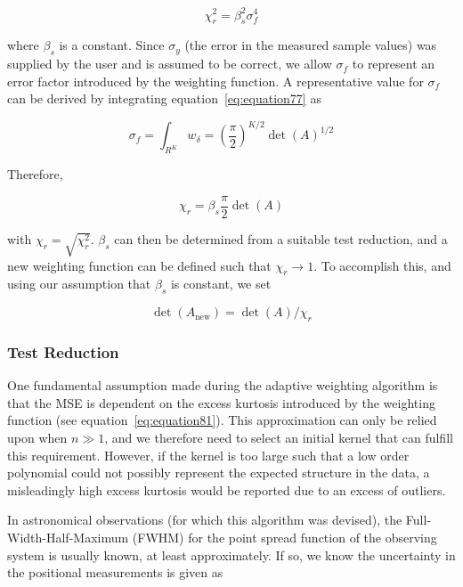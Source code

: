\begin{equation}
    \chi_r^2 = \beta_s^2 \sigma_f^4
    \label{eq:equation85}
\end{equation}

where $\beta_s$ is a constant.
Since $\sigma_y$ (the error in the measured sample values) was supplied by the
user and is assumed to be correct, we allow $\sigma_f$ to represent an error
factor introduced by the weighting function.
A representative value for $\sigma_f$ can be derived by integrating
equation~\ref{eq:equation77} as

\begin{equation}
    \sigma_f = \int_{R^K}{w_{\delta}} =
        \left(\frac{\pi}{2}\right)^{K/2} \det(A)^{1/2}
    \label{eq:equation29}
\end{equation}

Therefore,

\begin{equation}
    \chi_r = \beta_s \frac{\pi}{2} \det(A)
    \label{eq:equation30}
\end{equation}

with $\chi_r = \sqrt{\chi_r^2}$.  $\beta_s$ can then be determined from a
suitable test reduction, and a new weighting function can be defined such that
$\chi_r \to 1$.
To accomplish this, and using our assumption that $\beta_s$ is constant, we set

\begin{equation}
    \det(A_{\text{new}}) = \det(A) / \chi_r
    \label{eq:equation31}
\end{equation}


\subsubsection{Test Reduction}\label{subsubsec:adaptive-test-reduction}

One fundamental assumption made during the adaptive weighting algorithm is that
the MSE is dependent on the excess kurtosis introduced by the
weighting function (see equation~\ref{eq:equation81}).
This approximation can only be relied upon when $n \gg 1$, and we therefore
need to select an initial kernel that can fulfill this requirement.
However, if the kernel is too large such that a low order polynomial could not
possibly represent the expected structure in the data, a misleadingly high
excess kurtosis would be reported due to an excess of outliers.

In astronomical observations (for which this algorithm was devised), the
Full-Width-Half-Maximum (FWHM) for the point spread function of the observing
system is usually known, at least approximately.
If so, we know the uncertainty in the positional measurements is given as


